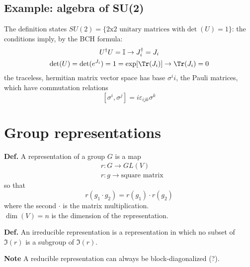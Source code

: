 \subsection{Example: algebra of SU(2)}
The definition states $SU(2) = \{\text{2x2 unitary matrices with}\det(U)=1\}$: the
conditions imply, by the BCH formula:
\begin{gather*}
    U^\dagger U  =\mathbb{I}\rightarrow J_i^\dagger=J_i\\
    \det(U)=\det(e^{J_i})=1=\exp[\Tr(J_i)] \rightarrow \Tr(J_i)=0
\end{gather*}
the traceless, hermitian matrix vector space has base $\sigma^ii$, the Pauli matrices,
which have commutation relations
$$[\sigma^i,\sigma^j] = i\varepsilon_{ijk}\sigma^k$$
\section{Group representations}
\textbf{Def.} A representation of a group $G$ is a map 
\begin{align*}
&r: G \rightarrow GL(V)\\
&r: g \rightarrow \text{square matrix}
\end{align*}
so that
$$r(g_1\cdot g_2) = r(g_1)\cdot	r(g_2)$$
where the second $\cdot$ is the matrix multiplication.\\
$\dim(V) = n$ is the dimension of the representation.

\textbf{Def.} An irreducible representation is a representation in which no subset
of $\Im(r)$ is a subgroup of $\Im(r)$.

\textbf{Note} A reducible representation can always be block-diagonalized (?).

